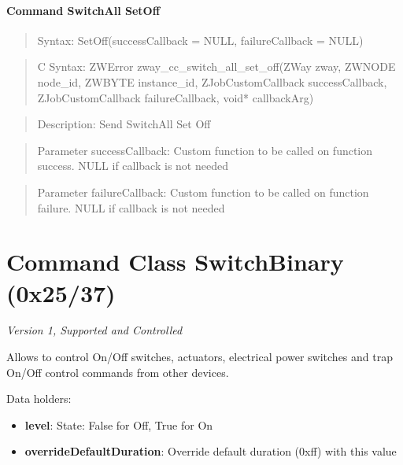\paragraph{Command SwitchAll SetOff}
\begin{quote}Syntax: SetOff(successCallback = NULL, failureCallback = NULL)\end{quote}
\begin{quote}C Syntax: ZWError zway\_cc\_switch\_all\_set\_off(ZWay zway, ZWNODE node\_id, ZWBYTE instance\_id, ZJobCustomCallback successCallback, ZJobCustomCallback failureCallback, void* callbackArg)\end{quote}
\begin{quote}Description: Send SwitchAll Set Off\end{quote}
\begin{quote}Parameter successCallback: Custom function to be called on function success. NULL if callback is not needed\end{quote}
\begin{quote}Parameter failureCallback: Custom function to be called on function failure. NULL if callback is not needed\end{quote}



\section{Command Class SwitchBinary (0x25/37)}

\textit{Version 1, Supported and Controlled}
\newline

Allows to control On/Off switches, actuators, electrical power switches and trap On/Off control commands from other devices.
\newline

\noindent
Data holders:

\begin{itemize}
\item \textbf{level}: State: False for Off, True for On
\item \textbf{overrideDefaultDuration}: Override default duration (0xff) with this value
\end{itemize}

